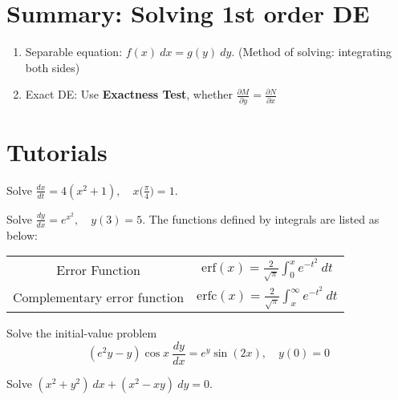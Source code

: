 \section*{Summary: Solving 1st order DE}

\begin{enumerate}
    \item Separable equation: $f(x) \>dx = g(y) \>dy$. (Method of solving: integrating both sides)
    \item Exact DE: Use \textbf{Exactness Test}, whether 
        $\displaystyle \frac{\partial M}{\partial y} = \frac{\partial N}{\partial x}$
\end{enumerate}

\section{Tutorials}

\begin{mdframed}
    \vspace{-0.25cm}
    \hspace{-0.25cm}
    \begin{Exercise}
        Solve $\displaystyle \frac{dx}{dt} = 4(x^2 + 1), \quad x\biggl(\displaystyle \frac{\pi}{4}\biggr) = 1$.
    \end{Exercise}

    \begin{Exercise}
        Solve $\displaystyle \frac{dy}{dx} = e^{x^2}, \quad y(3) = 5$. The functions defined by integrals are 
        listed as below:

        \begin{center}
            \begin{tabular}{c|c|}
                Error Function & $\displaystyle \text{erf}(x) = \frac{2}{\sqrt{\pi}} \int_{0}^{x} e^{-t^2}\> dt$\\[1em]
                Complementary error function & $\displaystyle \text{erfc}(x) = \frac{2}{\sqrt{\pi}} \int_{x}^{\infty} e^{-t^2}\> dt$\\[1em]
                \hline
            \end{tabular}
        \end{center}
    \end{Exercise}

    \begin{Exercise}
        Solve the initial-value problem
        \[
            (e^{2}y - y) \cos x \> \frac{dy}{dx} = e^y \sin(2x), \quad y(0) = 0
        \]
    \end{Exercise}

    \begin{Exercise}
        Solve $(x^2 + y^2) \> dx + (x^2 - xy) \> dy = 0$.
    \end{Exercise}
\end{mdframed}